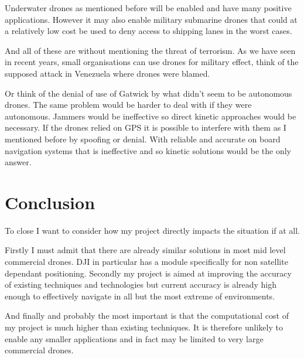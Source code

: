 \documentclass[]{article}
\begin{document}
Underwater drones as mentioned before will be enabled and have many positive applications. However it may also enable military submarine drones that could at a relatively low cost be used to deny access to shipping lanes in the worst cases.

And all of these are without mentioning the threat of terrorism. As we have seen in recent years, small organisations can use drones for military effect, think of the supposed attack in Venezuela where drones were blamed.

Or think of the denial of use of Gatwick by what didn't seem to be autonomous drones. The same problem would be harder to deal with if they were autonomous. Jammers would be ineffective so direct kinetic approaches would be necessary.
If the drones relied on GPS it is possible to interfere with them as I mentioned before by spoofing or denial. With reliable and accurate on board navigation systems that is ineffective and so kinetic solutions would be the only answer.

\section{Conclusion}

To close I want to consider how my project directly impacts the situation if at all.

Firstly I must admit that there are already similar solutions in most mid level commercial drones. DJI in particular has a module specifically for non satellite dependant positioning.
Secondly my project is aimed at improving the accuracy of existing techniques and technologies but current accuracy is already high enough to effectively navigate in all but the most extreme of environments.

And finally and probably the most important is that the computational cost of my project is much higher than existing techniques. It is therefore unlikely to enable any smaller applications and in fact may be limited to very large commercial drones.




\end{document}

